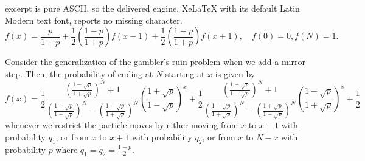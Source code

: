 \documentclass[10pt,a4paper]{amsart}
\begin{document}
excerpt is pure ASCII, so the delivered engine, XeLaTeX with its default Latin Modern text font, reports no missing character.
\begin{equation}\label{eq:inhomogeneous eq}
    f(x)=\frac{p}{1+p}+\frac{1}{2}\left(\frac{1-p}{1+p}\right)f(x-1)+\frac{1}{2}\left(\frac{1-p}{1+p}\right)f(x+1),  \quad f(0)=0, f(N)=1.
\end{equation}

\begin{theorem}\label{thm:probability mirror}
Consider the generalization of the gambler's ruin problem when we add a mirror step. Then, the probability of ending at $N$ starting at $x$ is given by
\begin{equation*}
    f(x)=\frac{1}{2}\frac{\left(\frac{1-\sqrt{p}}{1+\sqrt{p}}\right)^N+1}{\left(\frac{1+\sqrt{p}}{1-\sqrt{p}}\right)^N-\left(\frac{1-\sqrt{p}}{1+\sqrt{p}}\right)^N}\left(\frac{1+\sqrt{p}}{1-\sqrt{p}}\right)^x
    +\frac{1}{2}\frac{\left(\frac{1+\sqrt{p}}{1-\sqrt{p}}\right)^N+1}{\left(\frac{1-\sqrt{p}}{1+\sqrt{p}}\right)^N-\left(\frac{1+\sqrt{p}}{1-\sqrt{p}}\right)^N}\left(\frac{1-\sqrt{p}}{1+\sqrt{p}}\right)^x+\frac{1}{2}
\end{equation*}
whenever we restrict the particle moves by either moving from $x$ to $x-1$ with probability $q_1$, or from $x$ to $x+1$ with probability $q_2$, or from $x$ to $N-x$ with probability $p$ where $q_1=q_2=\frac{1-p}{2}$.
\end{theorem}
\end{document}
